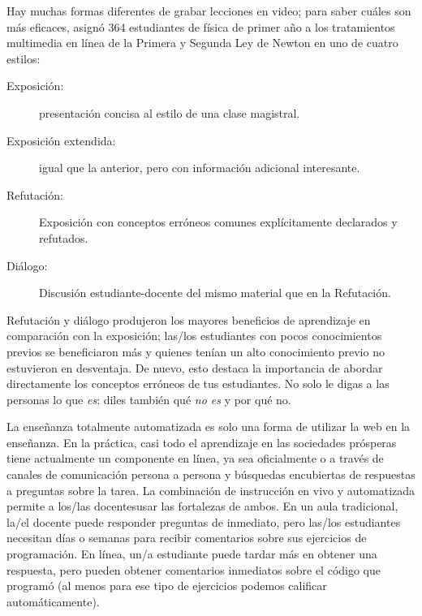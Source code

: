 Hay muchas formas diferentes de grabar lecciones en video;
para saber cuáles son más eficaces,
\cite{Mull2007a} asignó 364 estudiantes de física de primer año
a los tratamientos multimedia en línea de la Primera y Segunda Ley de Newton en uno de cuatro estilos:

\begin{description}

\item[Exposición:]
  presentación concisa al estilo de una clase magistral.

\item[Exposición extendida:]
  igual que la anterior, pero con información adicional interesante.

\item[Refutación:]
  Exposición con conceptos erróneos comunes explícitamente declarados y refutados.

\item[Diálogo:]
  Discusión estudiante-docente del mismo material que en la Refutación.

\end{description}

Refutación y diálogo produjeron los mayores beneficios de aprendizaje en comparación con la exposición;
las/los estudiantes con pocos conocimientos previos se beneficiaron más
y quienes tenían un alto conocimiento previo no estuvieron en desventaja.
De nuevo,
esto destaca la importancia de abordar directamente los conceptos erróneos de tus estudiantes.
No solo le digas a las personas lo que \emph{es}:
diles también qué \emph{no es} y por qué no.


La enseñanza totalmente automatizada es solo una forma de utilizar la web en la enseñanza.
En la práctica,
casi todo el aprendizaje en las sociedades prósperas tiene actualmente un componente en línea,
ya sea oficialmente
o a través de canales de comunicación persona a persona y búsquedas encubiertas de respuestas a preguntas sobre la tarea.
La combinación de instrucción en vivo y automatizada permite a los/las docentesusar las fortalezas de ambos.
En un aula tradicional,
la/el docente puede responder preguntas de inmediato,
pero las/los estudiantes necesitan días o semanas para recibir comentarios sobre sus ejercicios de programación.
En línea,
un/a estudiante puede tardar más en obtener una respuesta,
pero pueden obtener comentarios inmediatos sobre el código que programó
(al menos para ese tipo de ejercicios podemos calificar automáticamente).

